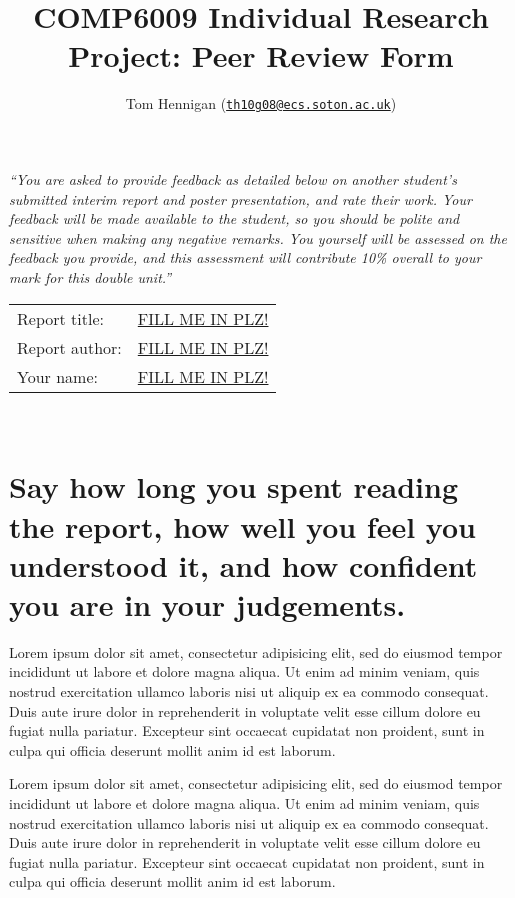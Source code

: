 \documentclass[10pt,a4paper]{article}
\newcommand{\mailto}[1]{\href{mailto:#1}{\nolinkurl{#1}}}
\begin{document}
\title{COMP6009 Individual Research Project: Peer Review Form}
\author{Tom Hennigan (\mailto{th10g08@ecs.soton.ac.uk})}

\maketitle

\begin{center}
\emph{``You are asked to provide feedback as detailed below on another student’s submitted interim report and poster presentation, and rate their work.  Your feedback will be made available to the student, so you should be polite and sensitive when making any negative remarks.  You yourself will be assessed on the feedback you provide, and this assessment will contribute 10\% overall to your mark for this double unit.''}\\[0.7cm]
\end{center}

\begin{tabular}{p{3cm} l}
Report title:	& \underline{FILL ME IN PLZ!} \\[0.1cm]
Report author:	& \underline{FILL ME IN PLZ!} \\[0.1cm]
Your name:		& \underline{FILL ME IN PLZ!} \\
\end{tabular}\\[0.0cm]


\section{Say how long you spent reading the report, how well you feel you understood it, and how confident you are in your judgements.}

\begin{framed}
Lorem ipsum dolor sit amet, consectetur adipisicing elit, sed do eiusmod
tempor incididunt ut labore et dolore magna aliqua. Ut enim ad minim veniam,
quis nostrud exercitation ullamco laboris nisi ut aliquip ex ea commodo
consequat. Duis aute irure dolor in reprehenderit in voluptate velit esse
cillum dolore eu fugiat nulla pariatur. Excepteur sint occaecat cupidatat non
proident, sunt in culpa qui officia deserunt mollit anim id est laborum.

Lorem ipsum dolor sit amet, consectetur adipisicing elit, sed do eiusmod
tempor incididunt ut labore et dolore magna aliqua. Ut enim ad minim veniam,
quis nostrud exercitation ullamco laboris nisi ut aliquip ex ea commodo
consequat. Duis aute irure dolor in reprehenderit in voluptate velit esse
cillum dolore eu fugiat nulla pariatur. Excepteur sint occaecat cupidatat non
proident, sunt in culpa qui officia deserunt mollit anim id est laborum.
\end{framed}
\end{document}
